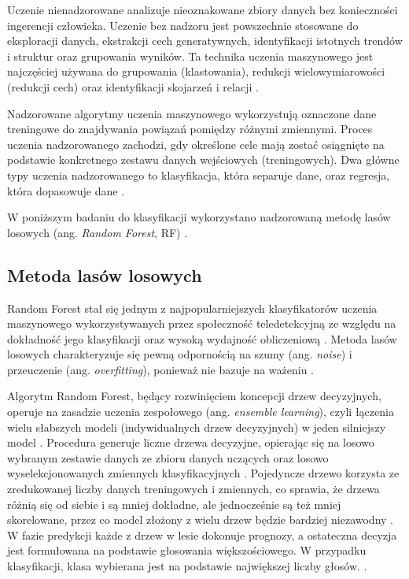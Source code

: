 \documentclass{amuthesis}
\begin{document}
Uczenie nienadzorowane analizuje nieoznakowane zbiory danych bez
konieczności ingerencji człowieka. Uczenie bez nadzoru jest powszechnie
stosowane do eksploracji danych, ekstrakcji cech generatywnych,
identyfikacji istotnych trendów i struktur oraz grupowania wyników. Ta
technika uczenia maszynowego jest najczęściej używana do grupowania
(klastowania), redukcji wielowymiarowości (redukcji cech) oraz
identyfikacji skojarzeń i relacji \autocite{sarker_2021_ml}.

Nadzorowane algorytmy uczenia maszynowego wykorzystują oznaczone dane
treningowe do znajdywania powiązań pomiędzy różnymi zmiennymi. Proces
uczenia nadzorowanego zachodzi, gdy określone cele mają zostać
osiągnięte na podstawie konkretnego zestawu danych wejściowych
(treningowych). Dwa główne typy uczenia nadzorowanego to klasyfikacja,
która separuje dane, oraz regresja, która dopasowuje dane
\autocite{sarker_2021_ml}.

W poniższym badaniu do klasyfikacji wykorzystano nadzorowaną metodę
lasów losowych (ang. \emph{Random Forest}, RF)
\autocite{breiman_2001_rf}.

\hypertarget{sec-random-forest}{%
\subsection{Metoda lasów losowych}\label{sec-random-forest}}

Random Forest stał się jednym z najpopularniejszych klasyfikatorów
uczenia maszynowego wykorzystywanych przez społeczność teledetekcyjną ze
względu na dokładność jego klasyfikacji oraz wysoką wydajność
obliczeniową \autocite{belgiu_2016_rf,sheykhmousa_2020_svm_vs_rf}.
Metoda lasów losowych charakteryzuje się pewną odpornością na szumy
(ang. \emph{noise}) i przeuczenie (ang. \emph{overfitting}), ponieważ
nie bazuje na ważeniu \autocite{gislason_2006_rf}.

Algorytm Random Forest, będący rozwinięciem koncepcji drzew decyzyjnych,
operuje na zasadzie uczenia zespołowego (ang. \emph{ensemble learning}),
czyli łączenia wielu słabszych modeli (indywidualnych drzew decyzyjnych)
w jeden silniejszy model
\autocite{aaron_2018_ml,sekulic_2020_rf_interpolation}. Procedura
generuje liczne drzewa decyzyjne, opierając się na losowo wybranym
zestawie danych ze zbioru danych uczących oraz losowo wyselekcjonowanych
zmiennych klasyfikacyjnych \autocite{breiman_2001_rf}. Pojedyncze drzewo
korzysta ze zredukowanej liczby danych treningowych i zmiennych, co
sprawia, że drzewa różnią się od siebie i są mniej dokładne, ale
jednocześnie są też mniej skorelowane, przez co model złożony z wielu
drzew będzie bardziej niezawodny
\autocite{sekulic_2020_rf_interpolation}. W fazie predykcji każde z
drzew w lesie dokonuje prognozy, a ostateczna decyzja jest formułowana
na podstawie głosowania większościowego. W przypadku klasyfikacji, klasa
wybierana jest na podstawie największej liczby głosów.
\autocite{breiman_2001_rf}.
\end{document}
